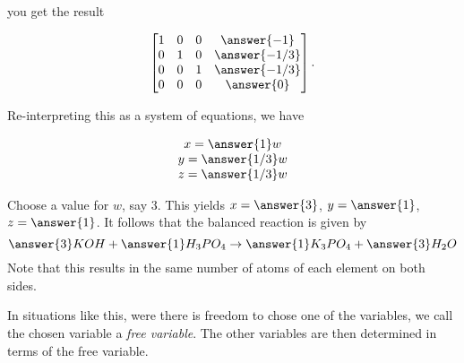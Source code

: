 \documentclass{ximera}
\begin{document}
\begin{exploration}
\begin{example}
\begin{solution}
  you get the result

  \begin{equation*}
    \begin{bmatrix}
      1 & 0 & 0 & \answer{-1} \\
      0 & 1 & 0 & \answer{-1/3} \\
      0 & 0 & 1 & \answer{-1/3} \\
      0 & 0 & 0 & \answer{0}
    \end{bmatrix}.
  \end{equation*}

  Re-interpreting this as a system of equations, we have

  \begin{equation*}
    \begin{array}{c}
      x = \answer{1}w \\
      y = \answer{1/3}w \\
      z = \answer{1/3}w \\
    \end{array}
  \end{equation*}

  Choose a value for $w$, say $3$. This yields $x=\answer{3}$, $y=\answer{1}$, $z=\answer{1}$. It follows that the balanced reaction is given by
  \begin{equation*}
    \answer{3}KOH+\answer{1}H_3PO_4\rightarrow \answer{1}K_3PO_4+\answer{3}H_2O
  \end{equation*}
  Note that this results in the same number of atoms of each element
  on both sides.


\begin{remark}

  In situations like this, were there is freedom to chose one of the variables, we call the chosen variable a \emph{free variable}. The other variables are then determined in terms of the free variable.

\end{remark}

\end{solution}

\end{example}

\end{exploration}
\end{document}
